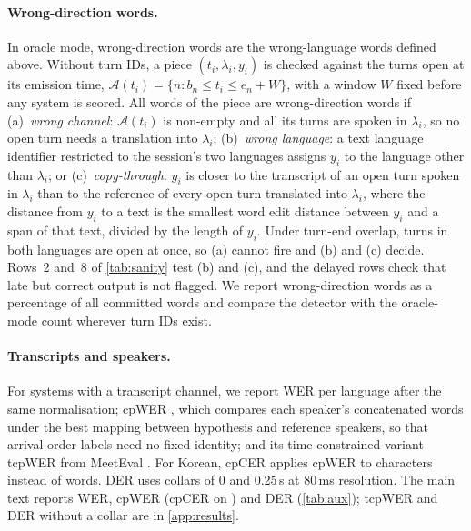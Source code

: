 \paragraph{Wrong-direction words.}
In oracle mode, wrong-direction words are the wrong-language words defined above. Without turn IDs, a piece $(t_i,\lambda_i,y_i)$ is checked against the turns open at its emission time, $\mathcal{A}(t_i)=\{n: b_n\le t_i\le e_n+W\}$, with a window $W$ fixed before any system is scored. All words of the piece are wrong-direction words if
(a)~\emph{wrong channel}: $\mathcal{A}(t_i)$ is non-empty and all its turns are spoken in $\lambda_i$, so no open turn needs a translation into $\lambda_i$;
(b)~\emph{wrong language}: a text language identifier restricted to the session's two languages assigns $y_i$ to the language other than $\lambda_i$; or
(c)~\emph{copy-through}: $y_i$ is closer to the transcript of an open turn spoken in $\lambda_i$ than to the reference of every open turn translated into $\lambda_i$, where the distance from $y_i$ to a text is the smallest word edit distance between $y_i$ and a span of that text, divided by the length of $y_i$.
Under turn-end overlap, turns in both languages are open at once, so (a) cannot fire and (b) and (c) decide. Rows~2 and~8 of \cref{tab:sanity} test (b) and (c), and the delayed rows check that late but correct output is not flagged. We report wrong-direction words as a percentage of all committed words and compare the detector with the oracle-mode count wherever turn IDs exist.

\paragraph{Transcripts and speakers.}
For systems with a transcript channel, we report WER per language after the same normalisation; cpWER \citep{watanabe2020chime}, which compares each speaker's concatenated words under the best mapping between hypothesis and reference speakers, so that arrival-order labels need no fixed identity; and its time-constrained variant tcpWER from MeetEval \citep{vonneumann2023meeteval}. For Korean, cpCER applies cpWER to characters instead of words. DER uses collars of 0 and 0.25\,s at 80\,ms resolution. The main text reports WER, cpWER (cpCER on \syn {}) and DER (\cref{tab:aux}); tcpWER and DER without a collar are in \cref{app:results}.

